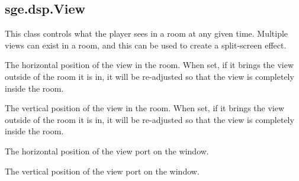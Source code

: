 \documentclass[letterpaper,10pt,english]{sphinxmanual}
\begin{document}
\subsection{sge.dsp.View}
\label{dsp:sge-dsp-view}

\begin{fulllineitems}
\label{dsp:sge.dsp.View}
This class controls what the player sees in a room at any given
time.  Multiple views can exist in a room, and this can be used to
create a split-screen effect.

\begin{fulllineitems}
\label{dsp:sge.dsp.View.x}
The horizontal position of the view in the room.  When set, if it
brings the view outside of the room it is in, it will be
re-adjusted so that the view is completely inside the room.

\end{fulllineitems}


\begin{fulllineitems}
\label{dsp:sge.dsp.View.y}
The vertical position of the view in the room.  When set, if it
brings the view outside of the room it is in, it will be
re-adjusted so that the view is completely inside the room.

\end{fulllineitems}


\begin{fulllineitems}
\label{dsp:sge.dsp.View.xport}
The horizontal position of the view port on the window.

\end{fulllineitems}


\begin{fulllineitems}
\label{dsp:sge.dsp.View.yport}
The vertical position of the view port on the window.

\end{fulllineitems}


\end{fulllineitems}
\end{document}
